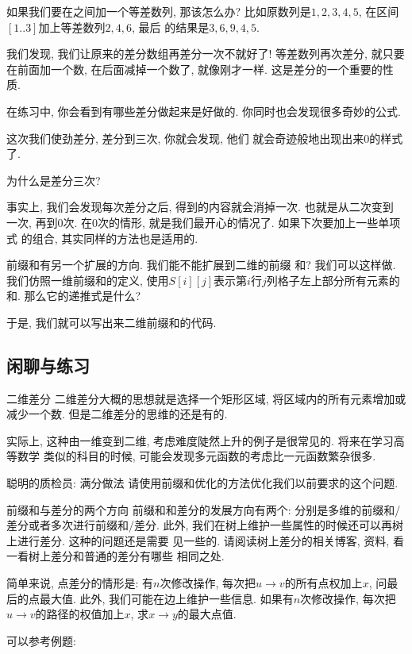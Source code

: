  如果我们要在之间加一个等差数列, 那该怎么办?
比如原数列是$1,2,3,4,5$, 在区间$[1..3]$加上等差数列$2, 4, 6$, 最后
的结果是$3, 6, 9, 4, 5$. 

我们发现, 我们让原来的差分数组再差分一次不就好了! 等差数列再次差分, 就只要
在前面加一个数, 在后面减掉一个数了, 就像刚才一样. 这是差分的一个重要的性质.

在练习中, 你会看到有哪些差分做起来是好做的. 你同时也会发现很多奇妙的公式. 

 这次我们使劲差分, 差分到三次, 你就会发现, 他们
就会奇迹般地出现出来0的样式了. 

\begin{ques}
    为什么是差分三次?
\end{ques}

事实上, 我们会发现每次差分之后, 得到的内容就会消掉一次. 也就是从二次变到
一次, 再到0次. 在0次的情形, 就是我们最开心的情况了. 如果下次要加上一些单项式
的组合, 其实同样的方法也是适用的. 

 前缀和有另一个扩展的方向. 我们能不能扩展到二维的前缀
和? 我们可以这样做. 我们仿照一维前缀和的定义, 使用$S[i][j]$表示第$i$行$j$列格子左上部分所有元素的和. 那么它的递推式是什么? 

于是, 我们就可以写出来二维前缀和的代码. 

\subsection*{闲聊与练习}

\begin{exercise}{二维差分}
    二维差分大概的思想就是选择一个矩形区域, 将区域内的所有元素增加或减少一个数. 
    但是二维差分的思维的还是有的.
    
    实际上, 这种由一维变到二维, 考虑难度陡然上升的例子是很常见的. 将来在学习高等数学
    类似的科目的时候, 可能会发现多元函数的考虑比一元函数繁杂很多. 
\end{exercise}

\begin{exercise}{聪明的质检员: 满分做法}
    请使用前缀和优化的方法优化我们以前要求的这个问题. 
\end{exercise}

\begin{exercise}{前缀和与差分的两个方向}
    前缀和和差分的发展方向有两个: 分别是多维的前缀和/差分或者多次进行前缀和/差分. 
    此外, 我们在树上维护一些属性的时候还可以再树上进行差分. 这种的问题还是需要
    见一些的. 请阅读树上差分的相关博客, 资料, 看一看树上差分和普通的差分有哪些
    相同之处. 

    简单来说, 点差分的情形是: 有$n$次修改操作, 每次把$u\to v$的所有点权加上$x$, 
    问最后的点最大值. 此外, 我们可能在边上维护一些信息. 如果有$n$次修改操作, 
    每次把$u\to v$的路径的权值加上$x$, 求$x\to y$的最大点值. 

    可以参考例题: ~
    ~ 

\end{exercise}


